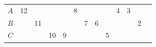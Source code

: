 \documentclass[reqno,a4paper,11pt]{amsart}
\theoremstyle{remark}
\numberwithin{equation}{section}
\newcommand{\dado}[6]{
    \node (pol#1) [draw=black, thick, fill=blue!60!green,rotate=0, fill opacity=0.2, text opacity=1,minimum size=3cm,regular polygon, regular polygon sides=#2] at #4 {$#1$};

    \foreach \n [count=\nu from 1] in #3
        \coordinate (#1coord\nu) at (pol#1.corner \nu);
    \coordinate (#1coord0) at (pol#1.corner #2);

    \foreach \n [count=\nu from 1, count=\nuu from 0] in #3
        \node[label={[label distance=2cm]},anchor=(\nu+(#2+1)/2 #5)*(360/#2)]at($(#1coord\nuu)!0.5!(#1coord\nu)$){$\n$};

    \foreach \n [count=\nu from 1, count=\nuu from 0] in #6
        \node[ anchor=(\nu+1/2 #5)*(360/#2)]at($(#1coord\nuu)!0.5!(#1coord\nu)$){$\n$};
}
\begin{document}
   \begin{figure}[!htb]
            \vspace{-2cm}
                \centering

                \vspace{.5cm}
                \begin{tabular}{m{0.35cm}m{0.35cm}m{0.35cm}m{0.35cm}m{0.35cm}m{0.35cm}m{0.35cm}m{0.35cm}m{0.35cm}m{0.35cm}m{0.35cm}m{0.35cm}m{0.35cm}}
                        \multicolumn{1}{c||}{{$A$}}&
                        \multicolumn{1}{c|}{12}&
                        \multicolumn{1}{c|}{}&
                        \multicolumn{1}{c|}{}&
                        \multicolumn{1}{c|}{}&
                        \multicolumn{1}{c|}{8}&
                        \multicolumn{1}{c|}{}&
                        \multicolumn{1}{c|}{}&
                        \multicolumn{1}{c|}{}&
                        \multicolumn{1}{c|}{4}&
                        \multicolumn{1}{c|}{3}&
                        \multicolumn{1}{c|}{}&
                        \multicolumn{1}{c|}{}
                        \\[1ex]
                        \multicolumn{1}{c||}{{$B$}}&
                        \multicolumn{1}{c|}{}&
                        \multicolumn{1}{c|}{11}&
                        \multicolumn{1}{c|}{}&
                        \multicolumn{1}{c|}{}&
                        \multicolumn{1}{c|}{}&
                        \multicolumn{1}{c|}{7}&
                        \multicolumn{1}{c|}{6}&
                        \multicolumn{1}{c|}{}&
                        \multicolumn{1}{c|}{}&
                        \multicolumn{1}{c|}{}&
                        \multicolumn{1}{c|}{2}&
                        \multicolumn{1}{c|}{}
                        \\[1ex]
                        \multicolumn{1}{c||}{{$C$}}&
                        \multicolumn{1}{c|}{}&
                        \multicolumn{1}{c|}{}&
                        \multicolumn{1}{c|}{10}&
                        \multicolumn{1}{c|}{9}&
                        \multicolumn{1}{c|}{}&
                        \multicolumn{1}{c|}{}&
                        \multicolumn{1}{c|}{}&
                        \multicolumn{1}{c|}{5}&

\end{tabular}
\end{figure}
\end{document}
